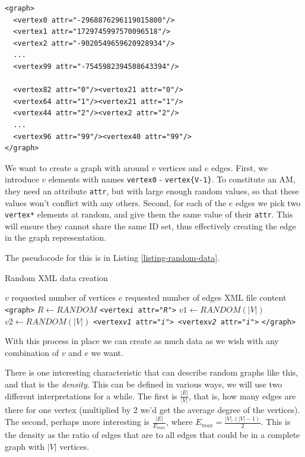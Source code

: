 \begin{scriptsize}
\begin{verbatim}
<graph>
  <vertex0 attr="-2968876296119015800"/>
  <vertex1 attr="1729745997570096518"/>
  <vertex2 attr="-9020549659620928934"/>
  ...
  <vertex99 attr="-7545982394508643394"/>

  <vertex82 attr="0"/><vertex21 attr="0"/>
  <vertex64 attr="1"/><vertex21 attr="1"/>
  <vertex44 attr="2"/><vertex2 attr="2"/>
  ...
  <vertex96 attr="99"/><vertex40 attr="99"/>
</graph>
\end{verbatim}
\end{scriptsize}

We want to create a graph with around $v$ vertices and $e$ edges. First, we introduce $v$ elements with names \texttt{vertex0} - \texttt{vertex\{V-1\}}. To constitute an AM, they need an attribute \texttt{attr}, but with large enough random values, so that these values won't conflict with any others. Second, for each of the $e$ edges we pick two \texttt{vertex*} elements at random, and give them the same value of their \texttt{attr}. This will ensure they cannot share the same ID set, thus effectively creating the edge in the graph representation.

The pseudocode for this is in Listing \ref{listing-random-data}.

\begin{algorithm}
\caption{Random XML data creation}
\label{listing-random-data}
\begin{algorithmic}
\REQUIRE $v$ requested number of vertices
\REQUIRE $e$ requested number of edges
\ENSURE XML file content
\PRINT \texttt{<graph>}
	\STATE $R \gets RANDOM$
	\PRINT \texttt{<vertex\textit{i} attr="\textit{R}">}
\ENDFOR
{}
	\STATE $v1 \gets RANDOM(|V|)$
	\STATE $v2 \gets RANDOM(|V|)$
	\PRINT \texttt{<vertex\textit{v1} attr="\textit{i}"> <vertex\textit{v2} attr="\textit{i}">}
\ENDFOR
\PRINT \texttt{</graph>}
\RETURN
\end{algorithmic}
\end{algorithm}

With this process in place we can create as much data as we wish with any combination of $v$ and $e$ we want.

There is one interesting characteristic that can describe random graphs like this, and that is the \textit{density}. This can be defined in various ways, we will use two different interpretations for a while. The first is $\frac{|E|}{|V|}$, that is, how many edges are there for one vertex (multiplied by 2 we'd get the average degree of the vertices). The second, perhaps more interesting is $\frac{|E|}{E_{max}}$, where $E_{max} = \frac{|V|.(|V|-1)}{2}$. This is the density as the ratio of edges that are to all edges that could be in a complete graph with $|V|$ vertices.

